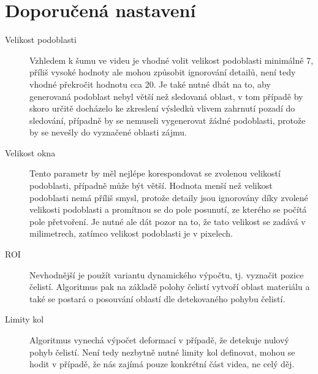 \documentclass[a4paper,12pt]{article}
\begin{document}
\section{Doporučená nastavení}
\label{sec:goodSettings}
\begin{description}
\item[Velikost podoblasti] Vzhledem k šumu ve videu je vhodné volit velikost podoblasti minimálně 7, příliš vysoké hodnoty ale mohou způsobit ignorování detailů, není tedy vhodné překročit hodnotu cca 20. Je také nutné dbát na to, aby generovaná podoblast nebyl větší než sledovaná oblast, v tom případě by skoro určitě docházelo ke zkreslení výsledků vlivem zahrnutí pozadí do sledování, případně by se nemuseli vygenerovat žádné podoblasti, protože by se nevešly do vyznačené oblasti zájmu.
\item[Velikost okna] Tento parametr by měl nejlépe korespondovat se zvolenou velikostí podoblasti, případně může být větší. Hodnota menší než velikost podoblasti nemá příliš smysl, protože detaily jsou ignorovány díky zvolené velikosti podoblasti a promítnou se do pole posunutí, ze kterého se počítá pole přetvoření. Je nutné ale dát pozor na to, že tato velikost se zadává v milimetrech, zatímco velikost podoblasti je v pixelech.
\item[ROI] Nevhodnější je použít variantu dynamického výpočtu, tj. vyznačit pozice čelistí. Algoritmus pak na základě polohy čelistí vytvoří oblast materiálu a také se postará o posouvání oblastí dle detekovaného pohybu čelistí. 
\item[Limity kol] Algoritmus vynechá výpočet deformací v případě, že detekuje nulový pohyb čelistí. Není tedy nezbytně nutné limity kol definovat, mohou se hodit v případě, že nás zajímá pouze konkrétní část videa, ne celý děj.
\end{description}
\newpage
\end{document}
